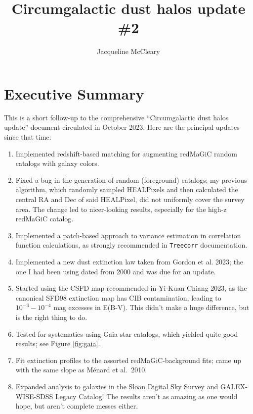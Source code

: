 \documentclass[11pt, oneside]{article}   	%
\title{Circumgalactic dust halos update \#2}
\author{Jacqueline McCleary}
\begin{document}
\maketitle


\section{Executive Summary}

This is a short follow-up to the comprehensive ``Circumgalactic dust halos update'' document circulated in October 2023. Here are the principal updates since that time: 

\begin{enumerate}
\item Implemented redshift-based matching for augmenting redMaGiC random catalogs with galaxy colors.%

\item Fixed a bug in the generation of random (foreground) catalogs; my previous algorithm, which randomly sampled HEALPixels and then calculated the central RA and Dec of said HEALPixel, did not uniformly cover the survey area. The change led to nicer-looking results, especially for the high-z redMaGiC catalog. 

\item Implemented a patch-based approach to variance estimation in correlation function calculations, as strongly recommended in \texttt{Treecorr} documentation. 

\item Implemented a new dust extinction law taken from Gordon et al. 2023; the one I had been using dated from 2000 and was due for an update. 

\item Started using the CSFD map recommended in Yi-Kuan Chiang 2023, as the canonical SFD98 extinction map has CIB contamination, leading to $10^{-3}-10^{-4}$ mag excesses in E(B-V). This didn't make a huge difference, but is the right thing to do. 

\item Tested for systematics using Gaia star catalogs, which yielded quite good results; see Figure \ref{fig:gaia}. 

\item Fit extinction profiles to the assorted redMaGiC-background fits; came up with the same slope as M\'{e}nard et al.~2010. 

\item Expanded analysis to galaxies in the Sloan Digital Sky Survey and GALEX-WISE-SDSS Legacy Catalog! The results aren't as amazing as one would hope, but aren't complete messes either. 

\end{enumerate}
\end{document}
